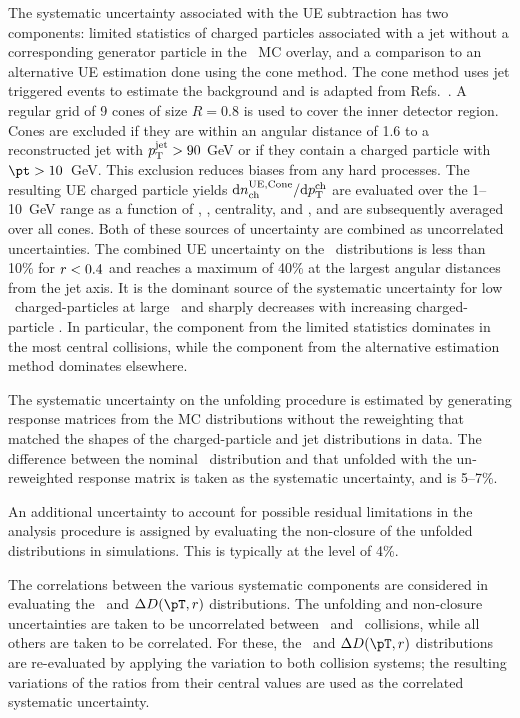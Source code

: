 The systematic uncertainty associated with the UE subtraction has two components: limited statistics of charged particles associated with a jet without a corresponding generator particle in the \pbpb\ MC overlay, and a comparison to an alternative UE estimation done using the cone method.
The cone method uses jet triggered events to estimate the background and is adapted from Refs.~\cite{Aaboud:2018hpb, Aaboud:2017bzv}.
A regular grid of 9 cones of size $R = 0.8$ is used to cover the inner detector region.
Cones are excluded if they are within an angular distance of 1.6 to a reconstructed jet with $\mbox{$p_{\mathrm{T}}^{\mathrm{jet}}$} > 90$ GeV or if they contain a charged particle with \mbox{$\pt > 10$ GeV}.
This exclusion reduces biases from any hard processes.
The resulting UE charged particle yields $\mathrm{d} n_{\mathrm{ch}}^{\mathrm{UE, Cone}} / \mathrm{d} \mbox{$p_{{\mathrm{T}}}^{\mathrm{ch}}$}$ are evaluated over the \mbox{1--10 GeV} range as a function of \pttrk, \ptjet, centrality, and \rvar, and are subsequently averaged over all cones.
Both of these sources of uncertainty are combined as uncorrelated uncertainties.
The combined UE uncertainty on the \Dptr\ distributions is less than 10\% for $\mbox{$r$} < 0.4$ and reaches a maximum of 40\% at the largest angular distances from the jet axis.
It is the dominant source of the systematic uncertainty for low \pt\ charged-particles at large \rvar\ and sharply decreases with increasing charged-particle \pT.
In particular, the component from the limited statistics dominates in the most central collisions, while the component from the alternative estimation method dominates elsewhere.


The systematic uncertainty on the unfolding procedure is estimated by generating response matrices from the MC distributions without the reweighting that matched the shapes of the charged-particle and jet distributions in data.
The difference between the nominal \Dptr\ distribution and that unfolded with the un-reweighted response matrix is taken as the systematic uncertainty, and is 5--7\%.

An additional uncertainty to account for possible residual limitations in the analysis procedure is assigned by evaluating the non-closure of the unfolded distributions in simulations.
This is typically at the level of 4\%.

The correlations between the various systematic components are considered in evaluating the \RDptr\ and $\Delta\Dptr$ distributions.
The unfolding and non-closure uncertainties are taken to be uncorrelated between \pp\ and \pbpb\ collisions, while all others are taken to be correlated.
For these, the \RDptr\ and $\Delta\Dptr$ distributions are re-evaluated by applying the variation to both collision systems; the resulting variations of the ratios from their central values are used as the correlated systematic uncertainty.


